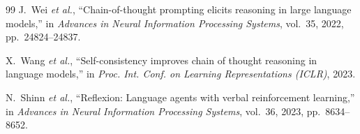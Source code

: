\documentclass[journal,onecolumn,12pt]{IEEEtran}
\begin{document}
\begin{thebibliography}{99}
 J.~Wei \emph{et al.}, ``Chain-of-thought prompting elicits reasoning in large language models,'' in \emph{Advances in Neural Information Processing Systems}, vol.~35, 2022, pp.~24824--24837.

 X.~Wang \emph{et al.}, ``Self-consistency improves chain of thought reasoning in language models,'' in \emph{Proc. Int. Conf. on Learning Representations (ICLR)}, 2023.

 N.~Shinn \emph{et al.}, ``Reflexion: Language agents with verbal reinforcement learning,'' in \emph{Advances in Neural Information Processing Systems}, vol.~36, 2023, pp.~8634--8652.

\end{thebibliography}
\end{document}

